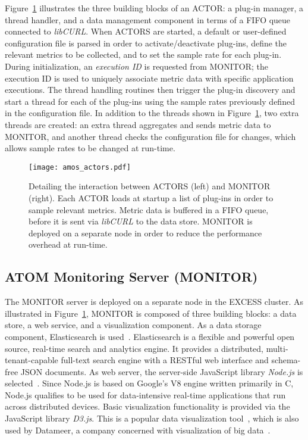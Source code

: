\documentclass[10pt,letterpaper]{IEEEtran}
\begin{document}
Figure~\ref{fig:atom-architecture} illustrates the three building blocks of an ACTOR: a plug-in manager,
a thread handler, and a data management component in terms of a FIFO queue connected to \emph{libCURL}.
When ACTORS are started, a default or user-defined configuration file is parsed in order to activate/deactivate
plug-ins, define the relevant metrics to be collected, and to set the sample rate for each plug-in.
During initialization, an \emph{execution ID} is requested from MONITOR; the execution ID is used to
uniquely associate metric data with specific application executions. The thread handling routines then
trigger the plug-in discovery and start a thread for each of the plug-ins using the sample rates previously
defined in the configuration file. In addition to the threads shown in Figure~\ref{fig:atom-architecture},
two extra threads are created: an extra thread aggregates and sends metric data to MONITOR, and another
thread checks the configuration file for changes, which allows sample rates to be changed at run-time.

\begin{figure}[b]
  \centering
\texttt{[image: amos\_actors.pdf]}
  \caption{Detailing the interaction between ACTORS (left) and MONITOR (right). Each ACTOR loads at startup
	a list of plug-ins in order to sample relevant metrics. Metric data is buffered in a FIFO queue, before it is
	sent via \emph{libCURL} to the data store. MONITOR is deployed on a separate node in order to reduce the
	performance overhead at run-time.}\label{fig:atom-architecture}
\end{figure}

\subsection{ATOM Monitoring Server (MONITOR)}
The MONITOR server is deployed on a separate node in the EXCESS cluster. As illustrated in
Figure~\ref{fig:atom-architecture}, MONITOR is composed of three building blocks: a data store, a web
service, and a visualization component. As a data storage component, Elasticsearch is used~\cite{elasticsearch14}.
Elasticsearch is a flexible and powerful open source, real-time search and analytics engine. It provides a
distributed, multi-tenant-capable full-text search engine with a RESTful web interface and schema-free JSON
documents. As web server, the server-side JavaScript library \emph{Node.js} is selected~\cite{opennms15}.
Since Node.js is based on Google's V8 engine written primarily in C, Node.js qualifies to be used
for data-intensive real-time applications that run across distributed devices. Basic visualization
functionality is provided via the JavaScript library \emph{D3.js}. This is a popular data visualization
tool~\cite{bostock14}, which is also used by Datameer, a company concerned with visualization of big data~\cite{viau14}. 
\end{document}
